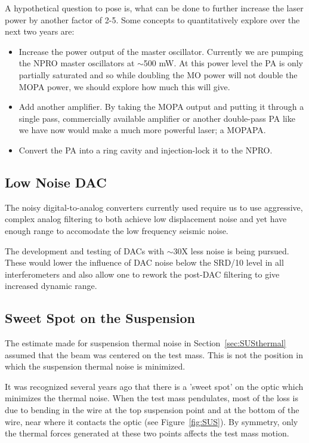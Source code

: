 A hypothetical question to pose is, what can be done to further increase the
laser power by another factor of 2-5. Some concepts to quantitatively explore
over the next two years are:

\begin{itemize}
\item Increase the power output of the master oscillator. Currently we are
      pumping the NPRO master oscillators at $\sim$500 mW. At this power level
      the PA is only partially saturated and so while doubling the MO power
      will not double the MOPA power, we should explore how much this will give.

\item Add another amplifier. By taking the MOPA output and putting it through
      a single pass, commercially available amplifier or another double-pass
      PA like we have now would make a much more powerful laser; a MOPAPA.

\item Convert the PA into a ring cavity and injection-lock it to the NPRO.
\end{itemize}

\subsection{Low Noise DAC}

The noisy digital-to-analog converters currently used require us to use
aggressive, complex analog filtering to both achieve low displacement noise
and yet have enough range to accomodate the low frequency seismic noise.

The development and testing of DACs with $\sim$30X less noise is being
pursued. These would lower the influence of DAC noise below the SRD/10 level
in all interferometers and also allow one to rework the post-DAC filtering
to give increased dynamic range.

\subsection{Sweet Spot on the Suspension}
\label{sec:sweetspot}

The estimate made for suspension thermal noise in Section~\ref{sec:SUSthermal}
assumed that the beam was centered on the test mass. This is not the position
in which the suspension thermal noise is minimized.

It was recognized several years ago \cite{Gaby:Thermal,Levin:SUSthermal} that 
there is a 'sweet spot' on the
optic which minimizes the thermal noise. When the test mass pendulates, most
of the loss is due to bending in the wire at the top suspension point and at
the bottom of the wire, near where it contacts the optic (see Figure~\ref{fig:SUS}). 
By symmetry, only the thermal forces generated at these two points affects the 
test mass motion.


